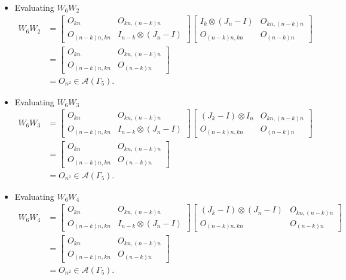\begin{itemize}
\item Evaluating $W_{6}W_{2}$
\begin{align*}
    W_6W_2
    &= \begin{bmatrix}
        O_{kn} & O_{kn, (n-k)n} \\
        O_{(n-k)n,kn} & I_{n - k} \otimes (J_n - I)
    \end{bmatrix}
    \begin{bmatrix}
        I_{k}\otimes (J_n-I) & O_{kn, (n-k)n} \\
        O_{(n-k)n,kn} & O_{(n - k)n}
    \end{bmatrix}\\
    &= \begin{bmatrix}
        O_{kn} & O_{kn, (n-k)n} \\
        O_{(n-k)n,kn} & O_{(n - k)n}
    \end{bmatrix}\\
    &= O_{n^2} \in\mathcal{A}(\Gamma_5).
\end{align*}

\item Evaluating $W_{6}W_{3}$
\begin{align*}
    W_6W_3
    &= \begin{bmatrix}
        O_{kn} & O_{kn, (n-k)n} \\
        O_{(n-k)n,kn} & I_{n - k} \otimes (J_n - I)
    \end{bmatrix}
    \begin{bmatrix}
        (J_k-I)\otimes I_n & O_{kn, (n-k)n} \\
        O_{(n-k)n,kn} & O_{(n - k)n}
    \end{bmatrix}\\
    &= \begin{bmatrix}
        O_{kn} & O_{kn, (n-k)n} \\
        O_{(n-k)n,kn} & O_{(n - k)n}
    \end{bmatrix}\\
    &= O_{n^2} \in\mathcal{A}(\Gamma_5).
\end{align*}

\item Evaluating $W_{6}W_{4}$
\begin{align*}
    W_6W_4
    &= \begin{bmatrix}
        O_{kn} & O_{kn, (n-k)n} \\
        O_{(n-k)n,kn} & I_{n - k} \otimes (J_n - I)
    \end{bmatrix}
    \begin{bmatrix}
        (J_k-I)\otimes(J_n-I) & O_{kn, (n-k)n} \\
        O_{(n-k)n,kn} & O_{(n - k)n}
    \end{bmatrix}\\
    &= \begin{bmatrix}
        O_{kn} & O_{kn, (n-k)n} \\
        O_{(n-k)n,kn} & O_{(n - k)n}
    \end{bmatrix}\\
    &= O_{n^2} \in\mathcal{A}(\Gamma_5).
\end{align*}


\end{itemize}

